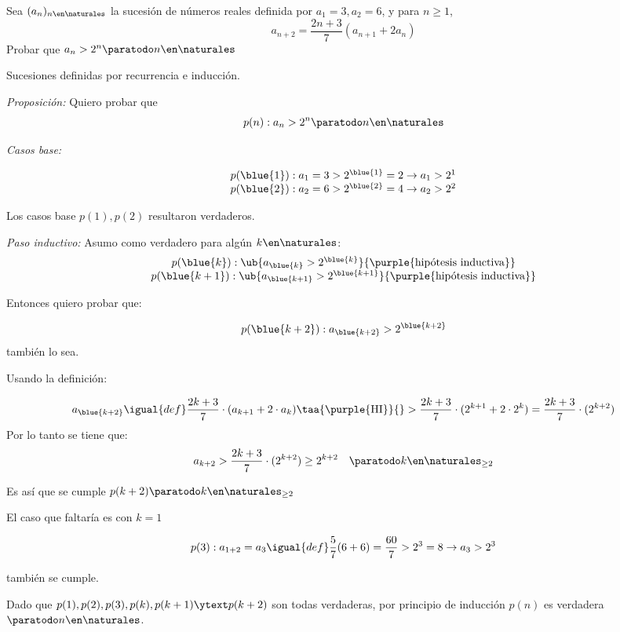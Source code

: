\begin{enunciado}{\ejExtra}
  Sea $(a_n)_{n\en\naturales}$ la sucesión de números reales definida por $a_1 = 3, a_2 = 6$, y para $n \geq 1$,
  $$
    a_{n+2} = \frac{2n + 3}{7} (a_{n+1} + 2a_n)
  $$
  Probar que $a_n > 2^n \paratodo n \en \naturales$
\end{enunciado}

Sucesiones definidas por recurrencia e inducción.

\textit{Proposición:}
Quiero probar que
$$
  p(n) : a_n > 2^n \paratodo n \en \naturales
$$

\textit{Casos base:}

$$
  \begin{array}{l}
    p(\blue{1}) : a_1 = 3 > 2^{\blue{1}} = 2 \to a_1 > 2^1 \\
    p(\blue{2}) : a_2 = 6 > 2^{\blue{2}} = 4 \to a_2 > 2^2 \\
  \end{array}
$$

Los casos base $p(1), p(2)$ resultaron verdaderos. \bigskip

\textit{Paso inductivo:}
Asumo como verdadero para algún $k \en \naturales$:
$$
  \begin{array}{c}
    p(\blue{k}) : \ub{ a_{\blue{k}} > 2^{\blue{k}} }{\purple{\text{hipótesis inductiva}}} \\
    p(\blue{k+1}) : \ub{a_{\blue{k+1}} > 2^{\blue{k+1}}}{\purple{\text{hipótesis inductiva}}}
  \end{array}
$$

Entonces quiero probar que:

$$
  p(\blue{k+2}) : a_{\blue{k+2}} > 2^{\blue{k+2}}
$$
también lo sea.

Usando la definición:

$$
  a_{\blue{k+2}}
  \igual{def}
  \frac{2k+3}{7} \cdot (a_{k+1} + 2 \cdot a_k)
  \taa{\purple{\text{HI}}}{}>
  \frac{2k+3}{7} \cdot (2^{k+1} + 2 \cdot 2^k)
  =
  \frac{2k+3}{7} \cdot (2^{k+2})
$$
Por lo tanto se tiene que:
$$
  a_{k+2} > \frac{2k+3}{7} \cdot (2^{k+2}) \geq 2^{k+2} \quad \paratodo k \en \naturales_{\geq 2}
$$

Es así que se cumple $p(k+2) \paratodo k \en \naturales_{\geq 2}$

El caso que faltaría es con $k = 1$

$$
  p(3): a_{1 + 2} = a_3 \igual{def} \frac{5}{7} (6 + 6) = \frac{60}{7}  > 2^3 = 8 \to a_3 > 2^3
$$

también se cumple.

Dado que $p(1), p(2), p(3), p(k), p(k+1) \ytext p(k+2)$ son todas verdaderas, por principio de inducción $p(n)$ es verdadera $\paratodo n \en \naturales$.


